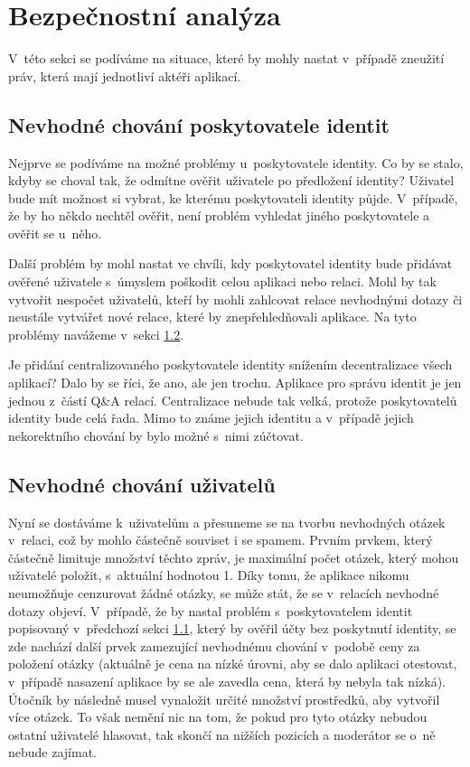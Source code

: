 \section{Bezpečnostní analýza}
V~této sekci se podíváme na situace, které by mohly nastat v~případě zneužití práv, která mají jednotliví aktéři aplikací.  
\subsection{Nevhodné chování poskytovatele identit}
\label{poskytovatel}
Nejprve se podíváme na možné problémy u~poskytovatele identity. Co by se stalo, kdyby se choval tak, že odmítne ověřit uživatele po předložení identity? Uživatel bude mít možnost si vybrat, ke kterému poskytovateli identity půjde. V~případě, že by ho někdo nechtěl ověřit, není problém vyhledat jiného poskytovatele a ověřit se u~něho. 

Další problém by mohl nastat ve chvíli, kdy poskytovatel identity bude přidávat ověřené uživatele s~úmyslem poškodit celou aplikaci nebo relaci. Mohl by tak vytvořit nespočet uživatelů, kteří by mohli zahlcovat relace nevhodnými dotazy či neustále vytvářet nové relace, které by znepřehledňovali aplikace. Na tyto problémy navážeme v~sekci \ref{nevhodne}. 

Je přidání centralizovaného poskytovatele identity snížením decentralizace všech aplikací? Dalo by se říci, že ano, ale jen trochu. Aplikace pro správu identit je jen jednou z~částí Q\&A relací.  Centralizace nebude tak velká, protože poskytovatelů identity bude celá řada. Mimo to známe jejich identitu a v~případě jejich nekorektního chování by bylo možné s~nimi zúčtovat. 
\subsection{Nevhodné chování uživatelů}
\label{nevhodne}
Nyní se dostáváme k~uživatelům a přesuneme se na tvorbu nevhodných otázek v~relaci, což by mohlo částečně souviset i se spamem. Prvním prvkem, který částečně limituje množství těchto zpráv, je maximální počet otázek, který mohou uživatelé položit, s~aktuální hodnotou 1. Díky tomu, že aplikace nikomu neumožňuje cenzurovat žádné otázky, se může stát, že se v~relacích nevhodné dotazy objeví. V~případě, že by nastal problém s~poskytovatelem identit popisovaný v~předchozí sekci \ref{poskytovatel}, který by ověřil účty bez poskytnutí identity, se zde nachází další prvek zamezující nevhodnému chování v~podobě ceny za položení otázky (aktuálně je cena na nízké úrovni, aby se dalo aplikaci otestovat, v~případě nasazení aplikace by se ale zavedla cena, která by nebyla tak nízká). Útočník by následně musel vynaložit určité množství prostředků, aby vytvořil více otázek. To však nemění nic na tom, že pokud pro tyto otázky nebudou ostatní uživatelé hlasovat, tak skončí na nižších pozicích a moderátor se o~ně nebude zajímat. 

